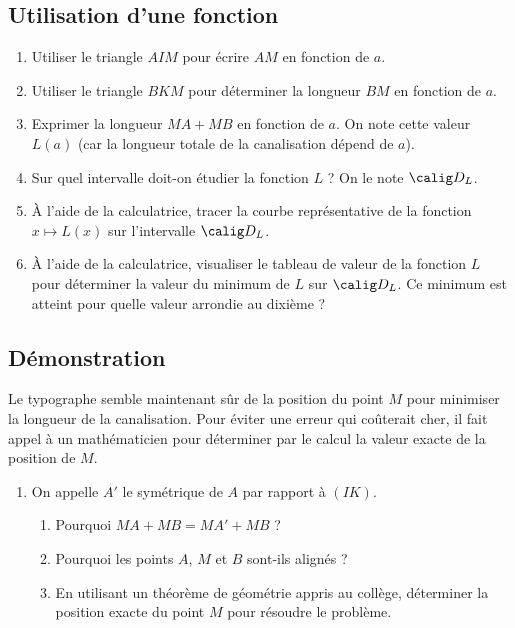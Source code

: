 \documentclass[10pt,french]{book}
\begin{document}
\subsection*{Utilisation d'une fonction}
\begin{enumerate}[resume]
    \item Utiliser le triangle $AIM$ pour écrire $AM$ en fonction de $a$.
    \item Utiliser le triangle $BKM$ pour déterminer la longueur $BM$ en fonction de $a$.
    \item Exprimer la longueur $MA + MB$ en fonction de $a$. On note cette valeur $L(a)$ (car la longueur totale de la canalisation dépend de $a$).
    \item Sur quel intervalle doit-on étudier la fonction $L$ ? On le note $\calig D_L$.
    \item À l'aide de la calculatrice, tracer la courbe représentative de la fonction $x \mapsto L(x)$ sur l'intervalle $\calig D_L$.
    \item À l'aide de la calculatrice, visualiser le tableau de valeur de la fonction $L$ pour déterminer la valeur du minimum de $L$ sur $\calig D_L$. Ce minimum est atteint pour quelle valeur arrondie au dixième ?
\end{enumerate}

\subsection*{Démonstration}
Le typographe semble maintenant sûr de la position du point $M$ pour minimiser la longueur de la canalisation. Pour éviter une erreur qui coûterait cher, il fait appel à un mathématicien pour déterminer par le calcul la valeur exacte de la position de $M$.
\begin{enumerate}[resume]
    \item On appelle $A'$ le symétrique de $A$ par rapport à $(IK)$.
        \begin{enumerate}
            \item Pourquoi $MA + MB = MA' + MB$ ?
            \item Pourquoi les points $A$, $M$ et $B$ sont-ils alignés ?
            \item En utilisant un théorème de géométrie appris au collège, déterminer la position exacte du point $M$ pour résoudre le problème.
        \end{enumerate}
\end{enumerate}
\end{document}
